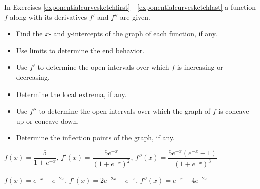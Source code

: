 \documentclass{ximera}
\begin{document}
\begin{question}
In Exercises \ref{exponentialcurvesketchfirst}  - \ref{exponentialcurvesketchlast} a function $f$ along with its derivatives $f'$ and $f''$ are given.

\begin{itemize}

\item  Find the $x$- and $y$-intercepts of the graph of each function, if any.

\item  Use limits to determine the end behavior.

\item  Use $f'$ to determine the open intervals over which $f$ is increasing or decreasing.

\item Determine the local extrema, if any.

\item  Use $f''$ to determine the open intervals over which the graph of $f$  is concave up or concave down.

\item  Determine the inflection points of the graph, if any.

\end{itemize}

\begin{problem}\label{exponentialcurvesketchfirst} 
$f(x) = \dfrac{5}{1 + e^{-x}}$,  $f'(x) = \dfrac{5 e^{-x}}{\left(1 + e^{-x} \right)^2}$, $f''(x) = \dfrac{5e^{-x}\left(e^{-x}-1\right)}{\left(1+e^{-x}\right)^3}$
\end{problem}

\begin{problem}\label{exponentialcurvesketchlast}
$f(x) = e^{-x} - e^{-2x}$, $f'(x) = 2e^{-2x} - e^{-x}$, $f''(x) = e^{-x} - 4 e^{-2x}$
\end{problem}
    
\end{question}
\end{document}
